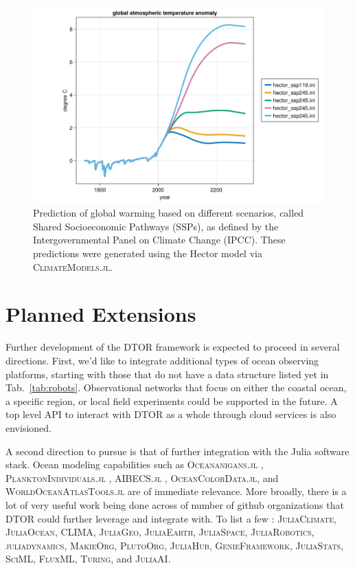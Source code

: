 \documentclass{juliacon}[12pt]
\newcommand{\pkg}[1]{{\small \textsc{#1}}}
\begin{document}
\begin{figure}[th] 
\includegraphics[width=\columnwidth]{figs/HectorDemo.png}
\caption{Prediction of global warming based on different scenarios, called Shared Socioeconomic Pathways (SSPs), as defined by the Intergovernmental Panel on Climate Change (IPCC). These predictions were generated using the Hector model \cite{Hector2015} via \pkg{ClimateModels.jl}.}
\label{fig:globalwarming}
\end{figure} 

\section{Planned Extensions}

Further development of the DTOR framework is expected to proceed in several directions. First, we'd like to integrate additional types of ocean observing platforms, starting with those that do not have a data structure listed yet in Tab.~\ref{tab:robots}. Observational networks that focus on either the coastal ocean, a specific region, or local field experiments could be supported in the future. A top level API to interact with DTOR as a whole through cloud services is also envisioned.

A second direction to pursue is that of further integration with the Julia software stack. Ocean modeling capabilities such as \pkg{Oceananigans.jl} \cite{OceananigansJOSS}, \pkg{PlanktonIndividuals.jl} \cite{Wu2022}, \pkg{AIBECS.jl} \cite{Pasquier2022}, \pkg{OceanColorData.jl}, and \pkg{WorldOceanAtlasTools.jl} are of immediate relevance. More broadly, there is a lot of very useful work being done across of number of github organizations that DTOR could further leverage and integrate with. To list a few : \pkg{JuliaClimate}, \pkg{JuliaOcean}, \pkg{CLIMA}, \pkg{JuliaGeo}, \pkg{JuliaEarth}, \pkg{JuliaSpace}, \pkg{JuliaRobotics}, \pkg{juliadynamics}, \pkg{MakieOrg}, \pkg{PlutoOrg}, \pkg{JuliaHub}, \pkg{GenieFramework}, \pkg{JuliaStats}, \pkg{SciML}, \pkg{FluxML}, \pkg{Turing}, and \pkg{JuliaAI}. 
\end{document}
